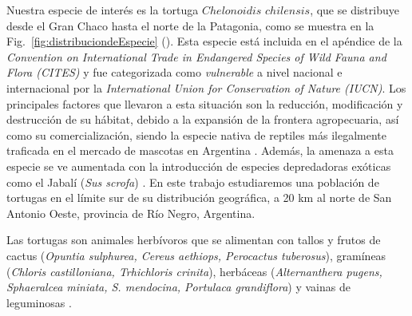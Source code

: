 Nuestra especie de interés es la tortuga $Chelonoidis$ $chilensis$, que se distribuye desde el Gran Chaco hasta el norte de la Patagonia, como se muestra en la Fig.~\ref{fig:distribuciondeEspecie} (\cite{chebez2008se}). Esta especie está incluida en el apéndice de la \textit{Convention on International Trade in Endangered Species of Wild Fauna and Flora (CITES)} y fue categorizada como \textit{vulnerable} a nivel nacional \cite{prado2012categorizacion} e internacional por la \textit{International Union for Conservation of Nature (IUCN)}.
Los principales factores que llevaron a esta situación son la reducción, modificación y destrucción de su hábitat, debido a la expansión de la frontera agropecuaria, así como su comercialización, siendo la especie nativa de reptiles más ilegalmente traficada en el mercado de mascotas en Argentina \cite{prado2012categorizacion}. Además, la amenaza a esta especie se ve aumentada con la introducción de especies depredadoras exóticas como el Jabalí (\textit{Sus scrofa}) \cite{kubisch2014chelonoidis}. En este trabajo estudiaremos una población de tortugas  en el límite sur de su distribución geográfica, a 20 km al norte de San Antonio Oeste, provincia de Río Negro, Argentina.  
   
Las tortugas son animales  herbívoros que se alimentan con tallos y frutos de cactus (\textit{Opuntia sulphurea, Cereus aethiops, Perocactus tuberosus}), gramíneas (\textit{Chloris castilloniana, Trhichloris crinita}), herbáceas (\textit{Alternanthera pugens, Sphaeralcea miniata, S. mendocina, Portulaca grandiflora}) y vainas de leguminosas \cite{zacarias2016biologia}.
   
